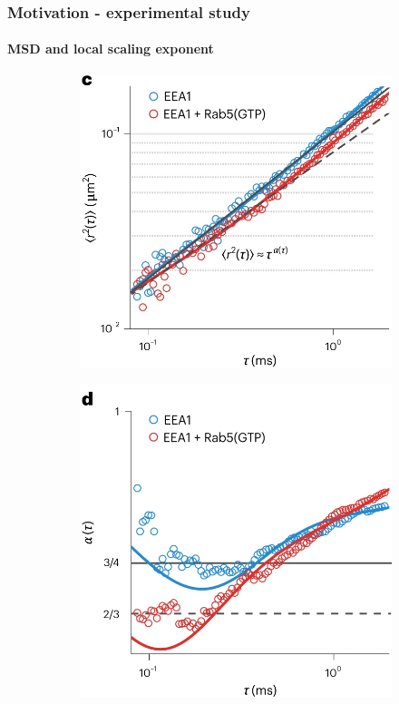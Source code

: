 \documentclass[handout]{beamer}
\begin{document}

\begin{frame}
    \frametitle{Motivation - experimental study}
    \framesubtitle{MSD and local scaling exponent}
    \centering
    \begin{figure}[h]
        \centering
        \begin{subfigure}[b]{0.49\textwidth}
            \centering
            \includegraphics[width=\textwidth]{./Singh_intro_с.png}
        \end{subfigure}
        \begin{subfigure}[b]{0.49\textwidth}
            \centering
            \includegraphics[width=\textwidth]{./Singh_intro_d.png}

\end{subfigure}
\end{figure}
\end{frame}
\end{document}
